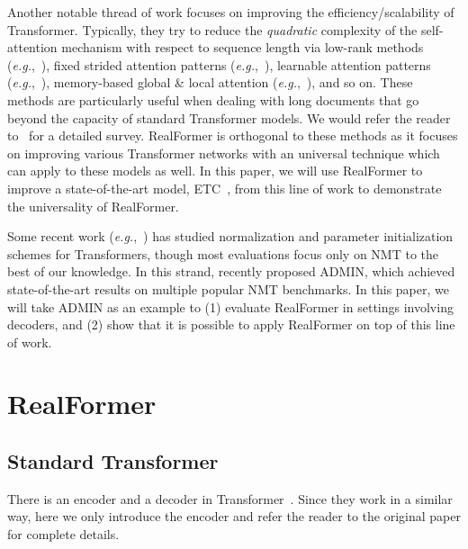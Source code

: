 \documentclass[11pt,a4paper]{article}
\begin{document}
Another notable thread of work focuses on improving the efficiency/scalability of Transformer. Typically, they try to reduce the \emph{quadratic} complexity of the self-attention mechanism with respect to sequence length via low-rank methods (\emph{e.g.},~\citet{Wang-2020-linformer}), fixed strided attention patterns (\emph{e.g.},~\citet{Child-2019-sparsetransformer}), learnable attention patterns (\emph{e.g.},~\citet{Kitaev-2020-reformer, Roy-2020-routingtransformer}), memory-based global \& local attention (\emph{e.g.},~\citet{Ainslie-2020-etc, Beltagy-2020-longformer, Zaheer-2020-bigbird}), and so on. 
These methods are particularly useful when dealing with long documents that go beyond the capacity of standard Transformer models. We would refer the reader to~\citet{Tay-2020-survey} for a detailed survey.
RealFormer is orthogonal to these methods as it focuses on improving various Transformer networks with an universal technique which can apply to these models as well. 
In this paper, we will use RealFormer to improve a state-of-the-art model, ETC~\citep{Ainslie-2020-etc}, from this line of work to demonstrate the universality of RealFormer.

Some recent work (\emph{e.g.},~\citet{Wang-2019-deeppreln, Xiong-2020-preln, Zhang-2018-fixup, Huang-2020-tfixup, Zhang-2019-mergedattn}) has studied normalization and parameter initialization schemes for Transformers, though most evaluations focus only on NMT to the best of our knowledge. 
In this strand, \citet{Liu-2020-admin} recently proposed ADMIN, which achieved state-of-the-art results on multiple popular NMT benchmarks. 
In this paper, we will take ADMIN as an example to (1) evaluate RealFormer in settings involving decoders, and (2) show that it is possible to apply RealFormer on top of this line of work.


\section{RealFormer}
\subsection{Standard Transformer}
There is an encoder and a decoder in Transformer~\citep{Vaswani-2017-attention}. Since they work in a similar way, here we only introduce the encoder and refer the reader to the original paper for complete details.
\end{document}
